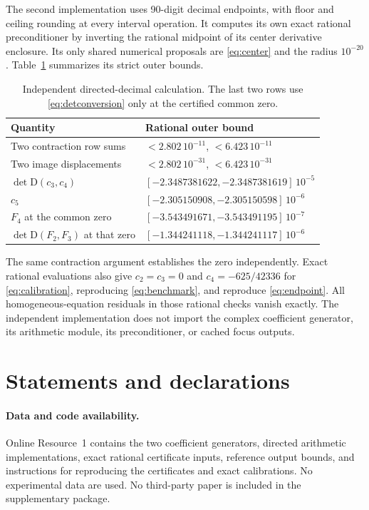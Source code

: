 \documentclass[11pt,a4paper]{article}
\theoremstyle{remark}
\newcommand{\D}{\mathrm D}
\numberwithin{equation}{section}
\begin{document}
The second implementation uses 90-digit decimal endpoints, with
floor and ceiling rounding at every interval operation. It computes
its own exact rational preconditioner by inverting the rational
midpoint of its center derivative enclosure. Its only shared
numerical proposals are \eqref{eq:center} and the radius $10^{-20}$.
Table~\ref{tab:independent} summarizes its strict outer bounds.
\begin{table}[htbp]
\centering
\caption{Independent directed-decimal calculation. The last two
rows use \eqref{eq:detconversion} only at the certified common zero.}
\label{tab:independent}
\small
\begin{tabular}{@{}ll@{}}
\toprule
Quantity & Rational outer bound\\
\midrule
Two contraction row sums & $<2.802\,10^{-11}$, $<6.423\,10^{-11}$\\
Two image displacements & $<2.802\,10^{-31}$, $<6.423\,10^{-31}$\\
$\det\D(c_3,c_4)$ & $[-2.3487381622,-2.3487381619]\,10^{-5}$\\
$c_5$ & $[-2.305150908,-2.305150598]\,10^{-6}$\\
$F_4$ at the common zero & $[-3.543491671,-3.543491195]\,10^{-7}$\\
$\det\D(F_2,F_3)$ at that zero & $[-1.344241118,-1.344241117]\,10^{-6}$\\
\bottomrule
\end{tabular}
\end{table}

The same contraction argument establishes the zero independently.
Exact rational evaluations also give $c_2=c_3=0$ and
$c_4=-625/42336$ for \eqref{eq:calibration}, reproducing
\eqref{eq:benchmark}, and reproduce \eqref{eq:endpoint}.
All homogeneous-equation residuals in those rational checks vanish
exactly. The independent implementation does not import the complex
coefficient generator, its arithmetic module, its preconditioner,
or cached focus outputs.

\section*{Statements and declarations}
\paragraph{Data and code availability.}
Online Resource~1 contains the two coefficient generators, directed
arithmetic implementations, exact rational certificate inputs,
reference output bounds, and instructions for reproducing the
certificates and exact calibrations. No experimental data are used.
No third-party paper is included in the supplementary package.
\end{document}
